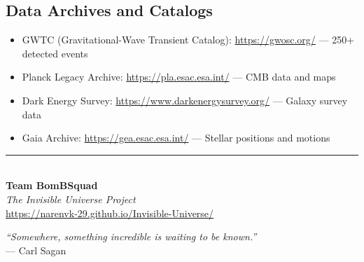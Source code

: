 \documentclass[11pt,a4paper]{article}
\begin{document}
\subsection{Data Archives and Catalogs}
\begin{itemize}[noitemsep]
    \item GWTC (Gravitational-Wave Transient Catalog): \url{https://gwosc.org/} --- 250+ detected events
    \item Planck Legacy Archive: \url{https://pla.esac.esa.int/} --- CMB data and maps
    \item Dark Energy Survey: \url{https://www.darkenergysurvey.org/} --- Galaxy survey data
    \item Gaia Archive: \url{https://gea.esac.esa.int/} --- Stellar positions and motions
\end{itemize}

\vfill

\begin{center}
\rule{0.7\textwidth}{0.4pt}\\[0.3cm]
{\Large\bfseries Team BomBSquad}\\[0.2cm]
\textit{The Invisible Universe Project}\\[0.2cm]
\url{https://narenvk-29.github.io/Invisible-Universe/}\\[0.5cm]

\begin{tcolorbox}[colback=lightcosmic, colframe=cosmicpurple, width=0.8\textwidth, arc=3mm]
    \centering
    \textit{``Somewhere, something incredible is waiting to be known.''}\\[0.1cm]
    --- Carl Sagan
\end{tcolorbox}
\end{center}
\end{document}
